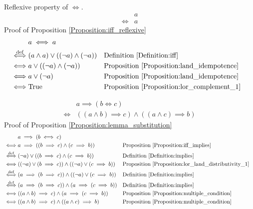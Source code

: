 \begin{prop}
\label{Proposition:iff_reflexive}
Reflexive property of $\iff$.
\begin{align*}
& a \\
\iff & a
\end{align*}
Proof of Proposition \ref{Proposition:iff_reflexive}
\begin{align*}
& a \iff a \\
\overset{\operatorname{def}}{\iff} & (a \land a) \lor ((\lnot a) \land (\lnot a))
& & \text{Definition \ref{Definition:iff}} \\
\iff & a \lor ((\lnot a) \land (\lnot a))
& & \text{Proposition \ref{Proposition:land_idempotence}} \\
\iff & a \lor (\lnot a)
& & \text{Proposition \ref{Proposition:land_idempotence}} \\
\iff & \text{True}
& & \text{Proposition \ref{Proposition:lor_complement_1}} \\
\end{align*}
\end{prop}

\begin{prop}
\label{Proposition:lemma_substitution}
\begin{align*}
& a \implies (b \iff c) \\
\iff & ((a \land b) \implies c) \land ((a \land c) \implies b)
\end{align*}
Proof of Proposition \ref{Proposition:lemma_substitution}
\begin{align*}
& a \implies (b \iff c) \\
\iff & a \implies ((b \implies c) \land (c \implies b))
& & \text{Proposition \ref{Proposition:iff_implies}} \\
\overset{\operatorname{def}}{\iff} & (\lnot a) \lor ((b \implies c) \land (c \implies b))
& & \text{Definition \ref{Definition:implies}} \\
\iff & ((\lnot a) \lor (b \implies c)) \land ((\lnot a) \lor (c \implies b))
& & \text{Proposition \ref{Proposition:lor_land_distributivity_1}} \\
\overset{\operatorname{def}}{\iff} & (a \implies (b \implies c)) \land ((\lnot a) \lor (c \implies b))
& & \text{Definition \ref{Definition:implies}} \\
\overset{\operatorname{def}}{\iff} & (a \implies (b \implies c)) \land (a \implies (c \implies b))
& & \text{Definition \ref{Definition:implies}} \\
\iff & ((a \land b) \implies c) \land (a \implies (c \implies b))
& & \text{Proposition \ref{Proposition:multiple_condition}} \\
\iff & ((a \land b) \implies c) \land ((a \land c) \implies b)
& & \text{Proposition \ref{Proposition:multiple_condition}} \\
\end{align*}
\end{prop}

